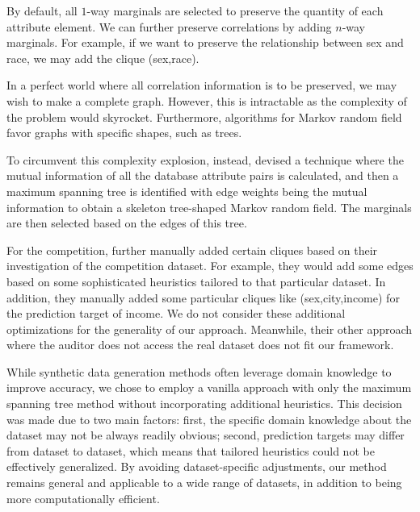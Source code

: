 \documentclass[manuscript,screen,review,anonymous]{acmart}
\begin{document}
By default, all $1$-way marginals are selected to preserve the quantity of each attribute element. We can further preserve correlations by adding $n$-way marginals. For example, if we want to preserve the relationship between sex and race, we may add the clique (sex,race).

In a perfect world where all correlation information is to be preserved, we may wish to make a complete graph. However, this is intractable as the complexity of the problem would skyrocket. Furthermore, algorithms for Markov random field favor graphs with specific shapes, such as trees.

To circumvent this complexity explosion, instead, \cite{mckenna2021winning} devised a technique where the mutual information of all the database attribute pairs is calculated, and then a maximum spanning tree is identified with edge weights being the mutual information to obtain a skeleton tree-shaped Markov random field. The marginals are then selected based on the edges of this tree.

For the competition, \cite{mckenna2021winning} further manually added certain cliques based on their investigation of the competition dataset. For example, they would add some edges based on some sophisticated heuristics tailored to that particular dataset. In addition, they manually added some particular cliques like (sex,city,income) for the prediction target of income. We do not consider these additional optimizations for the generality of our approach. Meanwhile, their other approach where the auditor does not access the real dataset does not fit our framework.

While synthetic data generation methods often leverage domain knowledge to improve accuracy, we chose to employ a vanilla approach with only the maximum spanning tree method without incorporating additional heuristics. This decision was made due to two main factors: first, the specific domain knowledge about the dataset may not be always readily obvious; second, prediction targets may differ from dataset to dataset, which means that tailored heuristics could not be effectively generalized. By avoiding dataset-specific adjustments, our method remains general and applicable to a wide range of datasets, in addition to being more computationally efficient.

\end{document}

